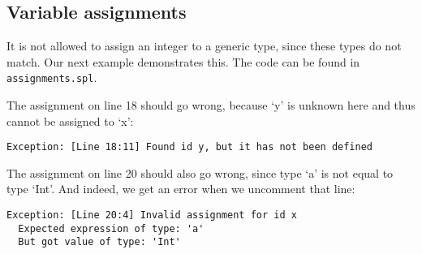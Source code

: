 \documentclass[a4paper]{article}
\begin{document}
\subsection{Variable assignments}
\label{var-assign}
It is not allowed to assign an integer to a generic type, since these types do not match. Our next example demonstrates this. The code can be found in {\tt assignments.spl}. 

The assignment on line 18 should go wrong, because `y' is unknown here and thus cannot be assigned to `x':
\begin{verbatim}
Exception: [Line 18:11] Found id y, but it has not been defined
\end{verbatim}

The assignment on line 20 should also go wrong, since type `a' is not equal to type `Int'. And indeed, we get an error when we uncomment that line: 
\begin{verbatim}
Exception: [Line 20:4] Invalid assignment for id x
  Expected expression of type: 'a'
  But got value of type: 'Int'
\end{verbatim}
\end{document}
